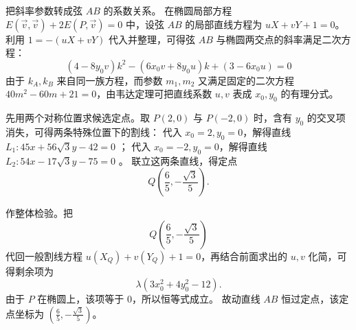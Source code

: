 \begin{solution}
把斜率参数转成弦 $AB$ 的系数关系。
在椭圆局部方程 $E(\vec{v}, \vec{v}) + 2E(P, \vec{v}) = 0$ 中，设弦 $AB$ 的局部直线方程为 $uX + vY + 1 = 0$。利用 $1 = -(uX + vY)$ 代入并整理，可得弦 $AB$ 与椭圆两交点的斜率满足二次方程：
$$ (4 - 8y_0 v)k^2 - (6x_0 v + 8y_0 u)k + (3 - 6x_0 u) = 0 $$
由于 $k_A,k_B$ 来自同一族方程，而参数 $m_1,m_2$ 又满足固定的二次方程 $40m^2 - 60m + 21 = 0$，由韦达定理可把直线系数 $u,v$ 表成 $x_0,y_0$ 的有理分式。

先用两个对称位置求候选定点。取 $P(2,0)$ 与 $P(-2,0)$ 时，含有 $y_0$ 的交叉项消失，可得两条特殊位置下的割线：
代入 $x_0 = 2, y_0 = 0$，解得直线 $L_1: 45x + 56\sqrt{3}y - 42 = 0$ ；
代入 $x_0 = -2, y_0 = 0$，解得直线 $L_2: 54x - 17\sqrt{3}y - 75 = 0$ 。
联立这两条直线，得定点
$$Q\left( \frac{6}{5}, -\frac{\sqrt{3}}{5} \right).$$

作整体检验。把
$$Q\left( \frac{6}{5}, -\frac{\sqrt{3}}{5} \right)$$
代回一般割线方程 $u(X_Q) + v(Y_Q) + 1 = 0$，再结合前面求出的 $u,v$ 化简，可得剩余项为
$$\lambda(3x_0^2 + 4y_0^2 - 12).$$
由于 $P$ 在椭圆上，该项等于 $0$，所以恒等式成立。
故动直线 $AB$ 恒过定点，该定点坐标为 $\left( \frac{6}{5}, -\frac{\sqrt{3}}{5} \right)$。
\end{solution}

